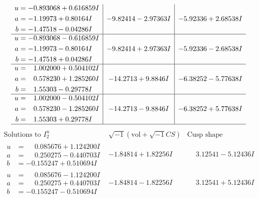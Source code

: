 \documentclass[1p]{elsarticle_modified}
\theoremstyle{definition}
\newcommand{\I}{\sqrt{-1}}
\begin{document}
$$\begin{array}{c|c|c}
\begin{aligned}
u &= -0.893068 + 0.616859 I \\
a &= -1.19973 + 0.80164 I \\
b &= -1.47518 - 0.04286 I\end{aligned}
 & -9.82414 - 2.97363 I & -5.92336 + 2.68538 I \\ \hline\begin{aligned}
u &= -0.893068 - 0.616859 I \\
a &= -1.19973 - 0.80164 I \\
b &= -1.47518 + 0.04286 I\end{aligned}
 & -9.82414 + 2.97363 I & -5.92336 - 2.68538 I \\ \hline\begin{aligned}
u &= \phantom{-}1.002000 + 0.504102 I \\
a &= \phantom{-}0.578230 + 1.285260 I \\
b &= \phantom{-}1.55303 - 0.29778 I\end{aligned}
 & -14.2713 + 9.8846 I & -6.38252 - 5.77638 I \\ \hline\begin{aligned}
u &= \phantom{-}1.002000 - 0.504102 I \\
a &= \phantom{-}0.578230 - 1.285260 I \\
b &= \phantom{-}1.55303 + 0.29778 I\end{aligned}
 & -14.2713 - 9.8846 I & -6.38252 + 5.77638 I\\
 \hline 
 \end{array}$$\newpage$$\begin{array}{c|c|c}  
\text{Solutions to }I^u_{2}& \I (\text{vol} + \sqrt{-1}CS) & \text{Cusp shape}\\
 \hline 
\begin{aligned}
u &= \phantom{-}0.085676 + 1.124200 I \\
a &= \phantom{-}0.250275 - 0.440703 I \\
b &= -0.155247 + 0.510694 I\end{aligned}
 & -1.84814 + 1.82256 I & \phantom{-}3.12541 - 5.12436 I \\ \hline\begin{aligned}
u &= \phantom{-}0.085676 - 1.124200 I \\
a &= \phantom{-}0.250275 + 0.440703 I \\
b &= -0.155247 - 0.510694 I\end{aligned}
 & -1.84814 - 1.82256 I & \phantom{-}3.12541 + 5.12436 I \\ \hline\begin{aligned}

\end{aligned}
\end{array}$$
\end{document}
